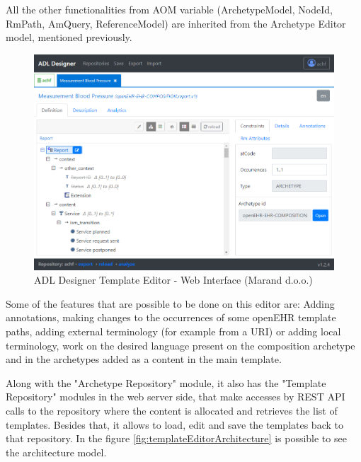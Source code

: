 \documentclass[mim_thesis.tex]{subfiles}
\begin{document}
All the other functionalities from AOM variable (ArchetypeModel, NodeId, RmPath, AmQuery, ReferenceModel) are inherited from the Archetype Editor model, mentioned previously.

\begin{figure}[H]
	\centering
    \includegraphics[width=1\textwidth]{img/template_editor_adldesigner.PNG}
	\caption{ADL Designer Template Editor - Web Interface (Marand d.o.o.)}
	\label{fig:templateEditor}
\end{figure}

Some of the features that are possible to be done on this editor are: Adding annotations, making changes to the occurrences of some openEHR template paths, adding external terminology (for example from a URI) or adding local terminology, work on the desired language present on the composition archetype and in the archetypes added as a content in the main template.

Along with the "Archetype Repository" module, it also has the "Template Repository" modules in the web server side, that make accesses by REST API calls to the repository where the content is allocated and retrieves the list of templates. Besides that, it allows to load, edit and save the templates back to that repository. In the figure \ref{fig:templateEditorArchitecture} is possible to see the architecture model. 
\end{document}
